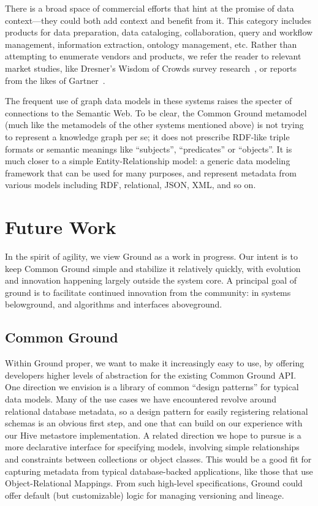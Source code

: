 \documentclass{cidr-2017}
\begin{document}
There is a broad space of commercial efforts that hint at the promise of data context---they could both add context and benefit from it. This category includes products for data preparation, data cataloging, collaboration, query and workflow management, information extraction, ontology management, etc.  Rather than attempting to enumerate vendors and products, we refer the reader to relevant market studies, like Dresner's Wisdom of Crowds survey research~\cite{dresnerdataprep, dresnercollectiveinsights}, or
reports from the likes of Gartner~\cite{gartnermetadata,gartnerdataprep,gartnerdatacatalog}.

The frequent use of graph data models in these systems raises the specter of connections to the Semantic Web. To be clear, the Common Ground metamodel (much like the metamodels of the other systems mentioned above) is not trying to represent a knowledge graph per se; it does not prescribe RDF-like triple formats or semantic meanings like ``subjects'', ``predicates'' or ``objects''. It is much closer to a simple Entity-Relationship model: a generic data modeling framework that can be used for many purposes, and represent metadata from various models including RDF, relational, JSON, XML, and so on.

\section{Future Work}
In the spirit of agility, we view Ground as a work in progress. Our intent is to keep Common Ground simple and stabilize it relatively quickly, with evolution and innovation happening largely outside the system core. 
A principal goal of ground is to facilitate continued innovation from the community: in systems belowground, and algorithms and interfaces aboveground.

\subsection{Common Ground}
Within Ground proper, we want to make it increasingly easy to use, by offering developers higher levels of abstraction for the existing Common Ground API.  One direction we envision is a library of common ``design patterns'' for typical data models. Many of the use cases we have encountered revolve around relational database metadata, so a design pattern for easily registering relational schemas is an obvious first step, and one that can build on our experience with our Hive metastore implementation. A related direction we hope to pursue is a more declarative interface for specifying models, involving simple relationships and constraints between collections or object classes. This would be a good fit for capturing metadata from typical database-backed applications, like those that use Object-Relational Mappings. From such high-level specifications, Ground could offer default (but customizable) logic for managing versioning and lineage.
\end{document}
